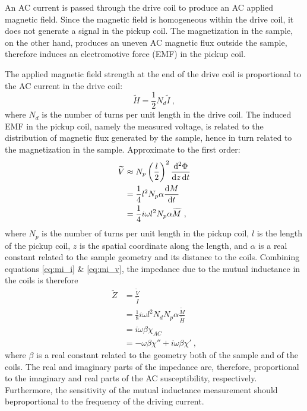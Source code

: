An AC current is passed through the drive coil to produce an AC applied magnetic field. Since the magnetic field is homogeneous within the drive coil, it does not generate a signal in the pickup coil. The magnetization in the sample, on the other hand, produces an uneven AC magnetic flux outside the sample, therefore induces an electromotive force (EMF) in the pickup coil.

The applied magnetic field strength at the end of the drive coil is proportional to the AC current in the drive coil:%
\begin{equation}%
    \widetilde{H} = \frac{1}{2}N_d\widetilde{I}~,\label{eq:mi_i}
\end{equation}%
where $N_d$ is the number of turns per unit length in the drive coil. The induced EMF in the pickup coil, namely the measured voltage, is related to the distribution of magnetic flux generated by the sample, hence in turn related to the magnetization in the sample. Approximate to the first order:%
\begin{align}%
    \widetilde{V} &\approx N_p\left(\frac{l}{2}\right)^2 \frac{\diff^2 \Phi}{\diff z \diff t}\nonumber\\
        &= \frac{1}{4}l^2N_p\alpha \frac{\diff M}{\diff t}\nonumber\\
        &= \frac{1}{4}i\omega l^2 N_p \alpha \widetilde{M}~,\label{eq:mi_v}
\end{align}%
where $N_p$ is the number of turns per unit length in the pickup coil, $l$ is the length of the pickup coil, $z$ is the spatial coordinate along the length, and $\alpha$ is a real constant related to the sample geometry and its distance to the coils. Combining equations \ref{eq:mi_i} \& \ref{eq:mi_v}, the impedance due to the mutual inductance in the coils is therefore%
\begin{align}%
    \widetilde{Z} &= \frac{\widetilde{V}}{\widetilde{I}}\nonumber\\
        &= \frac{1}{8}i\omega l^2 N_d N_p \alpha \frac{\widetilde{M}}{\widetilde{H}}\nonumber\\
        &= i\omega\beta\chi_{AC}\nonumber\\
        &= -\omega\beta\chi'' + i\omega\beta\chi'\label{eq:mi_z}~,
\end{align}%
where $\beta$ is a real constant related to the geometry both of the sample and of the coils. The real and imaginary parts of the impedance are, therefore, proportional to the imaginary and real parts of the AC susceptibility, respectively. Furthermore, the sensitivity of the mutual inductance measurement should beproportional to the frequency of the driving current.

